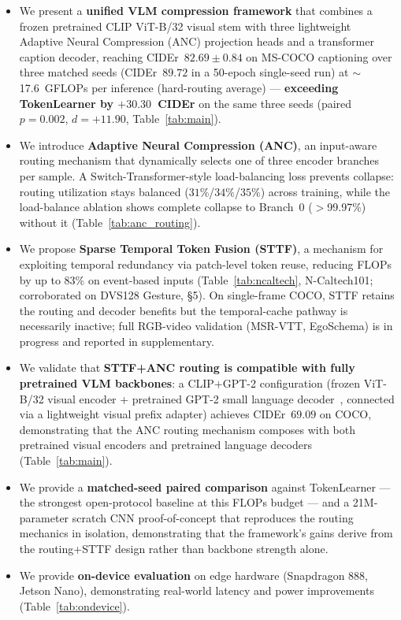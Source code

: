 \documentclass{article}
\begin{document}
\begin{itemize}
\item We present a \textbf{unified VLM compression framework} that combines a frozen pretrained CLIP ViT-B/32 visual stem with three lightweight Adaptive Neural Compression (ANC) projection heads and a transformer caption decoder, reaching CIDEr~$\mathbf{82.69 \pm 0.84}$ on MS-COCO captioning over three matched seeds (CIDEr~$89.72$ in a 50-epoch single-seed run) at $\sim$17.6~GFLOPs per inference (hard-routing average) --- \textbf{exceeding TokenLearner by $+30.30$~CIDEr} on the same three seeds (paired $p{=}0.002$, $d{=}{+}11.90$, Table~\ref{tab:main}).

\item We introduce \textbf{Adaptive Neural Compression (ANC)}, an input-aware routing mechanism that dynamically selects one of three encoder branches per sample. A Switch-Transformer-style load-balancing loss prevents collapse: routing utilization stays balanced ($31\%$/$34\%$/$35\%$) across training, while the load-balance ablation shows complete collapse to Branch~0 ($>$99.97\%) without it (Table~\ref{tab:anc_routing}).

\item We propose \textbf{Sparse Temporal Token Fusion (STTF)}, a mechanism for exploiting temporal redundancy via patch-level token reuse, reducing FLOPs by up to $83\%$ on event-based inputs (Table~\ref{tab:ncaltech}, N-Caltech101; corroborated on DVS128 Gesture, \S5). On single-frame COCO, STTF retains the routing and decoder benefits but the temporal-cache pathway is necessarily inactive; full RGB-video validation (MSR-VTT, EgoSchema) is in progress and reported in supplementary.

\item We validate that \textbf{STTF+ANC routing is compatible with fully pretrained VLM backbones}: a CLIP+GPT-2 configuration (frozen ViT-B/32 visual encoder + pretrained GPT-2 small language decoder~\cite{radford2019gpt2}, connected via a lightweight visual prefix adapter) achieves CIDEr~$69.09$ on COCO, demonstrating that the ANC routing mechanism composes with both pretrained visual encoders and pretrained language decoders (Table~\ref{tab:main}).

\item We provide a \textbf{matched-seed paired comparison} against TokenLearner --- the strongest open-protocol baseline at this FLOPs budget --- and a 21M-parameter scratch CNN proof-of-concept that reproduces the routing mechanics in isolation, demonstrating that the framework's gains derive from the routing+STTF design rather than backbone strength alone.

\item We provide \textbf{on-device evaluation} on edge hardware (Snapdragon 888, Jetson Nano), demonstrating real-world latency and power improvements (Table~\ref{tab:ondevice}).
\end{itemize}
\end{document}
